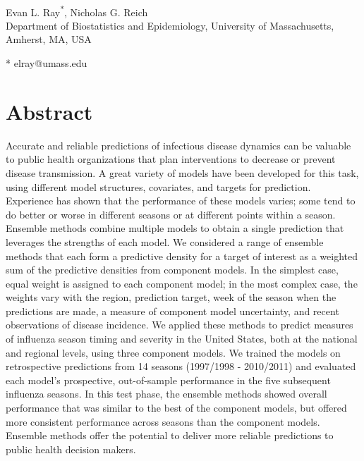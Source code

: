 \documentclass[10pt,letterpaper]{article}
\title{}
\author{}
\date{}
\begin{document}
\vspace*{0.2in}

\begin{flushleft}
{\Large
\textbf{} %
}
\newline
\\
Evan L. Ray\textsuperscript{*},
Nicholas G. Reich
\\
\bigskip
Department of Biostatistics and Epidemiology, University of Massachusetts, Amherst, MA, USA
\\

\bigskip

* elray@umass.edu

\end{flushleft}

\section{Abstract}\label{abstract}

Accurate and reliable predictions of infectious disease dynamics can be
valuable to public health organizations that plan interventions to
decrease or prevent disease transmission. A great variety of models have
been developed for this task, using different model structures,
covariates, and targets for prediction. Experience has shown that the
performance of these models varies; some tend to do better or worse in
different seasons or at different points within a season. Ensemble
methods combine multiple models to obtain a single prediction that
leverages the strengths of each model. We considered a range of ensemble
methods that each form a predictive density for a target of interest as
a weighted sum of the predictive densities from component models. In the
simplest case, equal weight is assigned to each component model; in the
most complex case, the weights vary with the region, prediction target,
week of the season when the predictions are made, a measure of component
model uncertainty, and recent observations of disease incidence. We
applied these methods to predict measures of influenza season timing and
severity in the United States, both at the national and regional levels,
using three component models. We trained the models on retrospective
predictions from 14 seasons (1997/1998 - 2010/2011) and evaluated each
model's prospective, out-of-sample performance in the five subsequent
influenza seasons. In this test phase, the ensemble methods showed
overall performance that was similar to the best of the component
models, but offered more consistent performance across seasons than the
component models. Ensemble methods offer the potential to deliver more
reliable predictions to public health decision makers.
\end{document}

